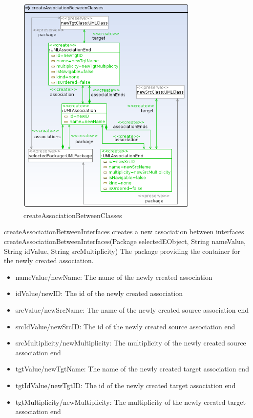 \begin{figure}[H]
  \centering
  \includegraphics[width=0.8\textwidth]{pics/createAssociationBetweenClasses.png}
  \caption{createAssociationBetweenClasses}
  \label{createAssociationBetweenClasses}
\end{figure}
\op
{createAssociationBetweenInterfaces}
{creates a new association between interfaces}
{createAssociationBetweenInterfaces(Package selectedEObject, String nameValue,
String idValue, String srcMultiplicity)} {The package providing the container
for the newly created association.} {
\begin{itemize}
 \item nameValue/newName: The name of the newly created association
 \item idValue/newID: The id of the newly created association
 \item srcValue/newSrcName: The name of the newly created source association end
 \item srcIdValue/newSrcID: The id of the newly created source association end
 \item srcMultiplicity/newMultiplicity: The multiplicity of the newly created
 source association end
 \item tgtValue/newTgtName: The name of the newly created target association end
 \item tgtIdValue/newTgtID: The id of the newly created target association end
 \item tgtMultiplicity/newMultiplicity: The multiplicity of the newly created
 target association end
\end{itemize}
}
